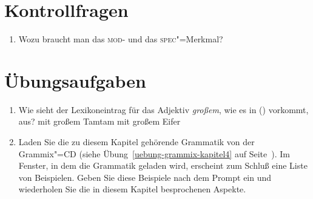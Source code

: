 
\section*{Kontrollfragen}


\begin{enumerate}
\item Wozu braucht man das \textsc{mod}- und das \textsc{spec}"=Merkmal?
\end{enumerate}

\section*{Übungsaufgaben}

\begin{enumerate}
\item Wie sieht der Lexikoneintrag für das Adjektiv \emph{großem}, wie es in ()
vorkommt, aus?
\eal
\ex mit großem Tamtam
\ex mit großem Eifer
\zl

\item Laden Sie die zu diesem Kapitel gehörende Grammatik von der Grammix"=CD
(siehe Übung~\ref{uebung-grammix-kapitel4} auf Seite~\pageref{uebung-grammix-kapitel4}).
Im Fenster, in dem die Grammatik geladen wird, erscheint zum Schluß eine Liste von Beispielen.
Geben Sie diese Beispiele nach dem Prompt ein und wiederholen Sie die in diesem Kapitel besprochenen
Aspekte.

\end{enumerate}
